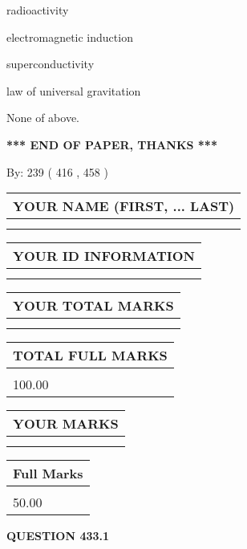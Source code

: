 \documentclass[12pt]{article}
\begin{document}
 
radioactivity
 
 
electromagnetic induction
 
 
superconductivity
 
 
law of universal gravitation
 
 
 None of above.
 
 
   
   
\vspace{1.0in} 
{\textbf{\large{ *** END OF PAPER, THANKS *** }}} 
   
   
\hspace{1.0in} By: 
 239 ( 416 ,  458 )
   
   
   
   
\newpage 
\setcounter{page}{ 
   433001 } 
   
   
   
   
\noindent\begin{tabular}{|l|}
\hline
YOUR NAME (FIRST, ... LAST)  \\
\hline
 \\ 
 \\ 
\hline
\end{tabular}
\hspace{0.05in} \begin{tabular}{|l|}
\hline
 YOUR   ID   INFORMATION  \\
\hline
 \\ 
 \\ 
\hline
\end{tabular}
   
   
\vspace{0.2in}\noindent\begin{tabular}{|l|}
\hline
YOUR TOTAL MARKS  \\
\hline
 \\ 
 \\ 
\hline
\end{tabular}
\hspace{0.05in} \begin{tabular}{|l|}
\hline
TOTAL FULL MARKS  \\
\hline
 \\ 
100.00 \\
\hline
\end{tabular}
  
\vspace{0.2in}
  
\noindent\begin{tabular}{|l|}
\hline
 YOUR MARKS  \\
\hline
 \\ 
 \\ 
\hline
\end{tabular}
\hspace{0.05in} \begin{tabular}{|l|}
\hline
 Full Marks  \\
\hline
 \\ 
50.00 \\
\hline
\end{tabular}
{\textbf{\Large{QUESTION
433.1 
}}}
  
\end{document}
